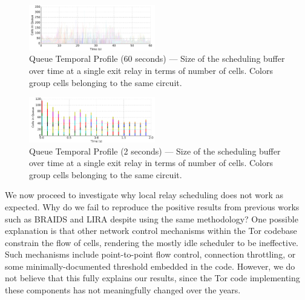 \begin{figure} \centering
  \includegraphics[width=0.49\textwidth]{images/scheduling_far.png}
  \caption[Queue Temporal Profile (60 seconds)]{Queue Temporal Profile (60
    seconds) --- Size of the scheduling buffer over time at a single exit relay
    in terms of number of cells. Colors group cells belonging to the same
    circuit.}
  \label{fig:scheduling_far}
\end{figure}

\begin{figure} \centering
  \includegraphics[width=0.49\textwidth]{images/scheduling_close.png}
  \caption[Queue Temporal Profile (2 seconds)]{Queue Temporal Profile (2
    seconds) --- Size of the scheduling buffer over time at a single exit relay
    in terms of number of cells. Colors group cells belonging to the same
    circuit.}
  \label{fig:scheduling_close}
\end{figure}


We now proceed to investigate why local relay scheduling does not work as expected.
Why do we fail to reproduce the positive results from previous works such as BRAIDS and LIRA despite using the same methodology?
One possible explanation is that other network control mechanisms within the Tor codebase constrain the flow of cells, rendering the mostly idle scheduler to be ineffective.
Such mechanisms include point-to-point flow control, connection throttling, or some minimally-documented threshold embedded in the code.
However, we do not believe that this fully explains our results, since the Tor code implementing these components has not meaningfully changed over the years.

